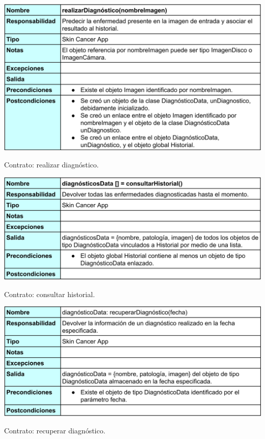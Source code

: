    \begin{table}[H]
 	\centering
 	\includegraphics[scale = 0.16]{imagenes/contrato4.png}
 	\caption{Contrato: realizar diagnóstico.}
 	\label{fig:contrato4}
 \end{table}
 
   \begin{table}[H]
 	\centering
 	\includegraphics[scale = 0.16]{imagenes/contrato5.png}
 	\caption{Contrato: consultar historial.}
 	\label{fig:contrato5}
 \end{table}
 
    \begin{table}[H]
 	\centering
 	\includegraphics[scale = 0.16]{imagenes/contrato6.png}
 	\caption{Contrato: recuperar diagnóstico.}
 	\label{fig:contrato6}
 \end{table}
 
